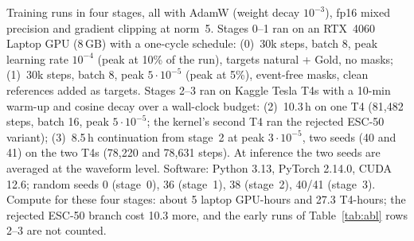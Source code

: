 \documentclass[conference]{IEEEtran}
\begin{document}
Training runs in four stages, all with AdamW (weight decay $10^{-3}$), fp16 mixed precision and gradient clipping at
norm~5. Stages 0--1 ran on an RTX~4060 Laptop GPU (8\,GB) with a one-cycle schedule: (0)~30k steps, batch 8, peak
learning rate $10^{-4}$ (peak at 10\% of the run), targets natural + Gold, no masks; (1)~30k steps, batch 8, peak
$5\cdot10^{-5}$ (peak at 5\%), event-free masks, clean references added as targets. Stages 2--3 ran on Kaggle Tesla
T4s with a 10-min warm-up and cosine decay over a wall-clock budget: (2)~10.3\,h on one T4 (81,482 steps, batch 16,
peak $5\cdot10^{-5}$; the kernel's second T4 ran the rejected ESC-50 variant); (3)~8.5\,h continuation from stage~2
at peak $3\cdot10^{-5}$, two seeds (40 and 41) on the two T4s (78,220 and 78,631 steps). At inference the two seeds
are averaged at the waveform level. Software: Python 3.13, PyTorch 2.14.0, CUDA 12.6; random seeds 0 (stage~0), 36
(stage~1), 38 (stage~2), 40/41 (stage~3). Compute for these four stages: about 5 laptop GPU-hours and 27.3 T4-hours;
the rejected ESC-50 branch cost 10.3 more, and the early runs of Table~\ref{tab:abl} rows 2--3 are not counted.
\end{document}
